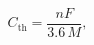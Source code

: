 \documentclass[preview]{standalone}
\begin{document}
\[C_\text{th} = \frac{nF}{3.6\,M}, \tag{5.A}\]
\end{document}
